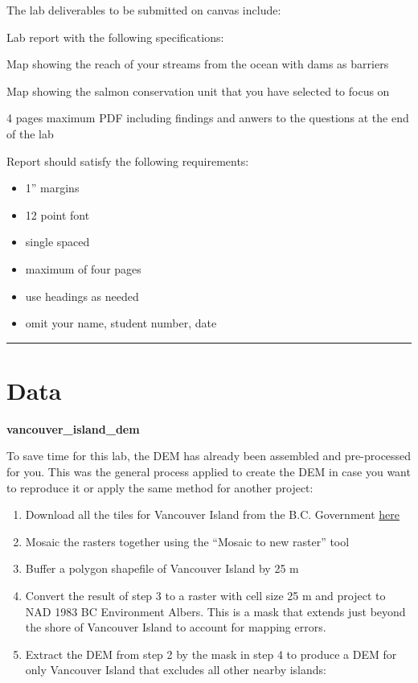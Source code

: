 \documentclass[
]{book}
\providecommand{\tightlist}{%
  \setlength{\itemsep}{0pt}\setlength{\parskip}{0pt}}
\begin{document}
The lab deliverables to be submitted on canvas include:

Lab report with the following specifications:

Map showing the reach of your streams from the ocean with dams as barriers

Map showing the salmon conservation unit that you have selected to focus on

4 pages maximum PDF including findings and anwers to the questions at the end of the lab

Report should satisfy the following requirements:

\begin{itemize}
\tightlist
\item
  1'' margins
\item
  12 point font
\item
  single spaced
\item
  maximum of four pages
\item
  use headings as needed
\item
  omit your name, student number, date
\end{itemize}

\begin{center}\rule{0.5\linewidth}{0.5pt}\end{center}

\hypertarget{data-1}{%
\section*{Data}\label{data-1}}

\textbf{vancouver\_island\_dem}

To save time for this lab, the DEM has already been assembled and pre-processed for you. This was the general process applied to create the DEM in case you want to reproduce it or apply the same method for another project:

\begin{enumerate}
\def\labelenumi{\arabic{enumi}.}
\tightlist
\item
  Download all the tiles for Vancouver Island from the B.C. Government \href{https://www2.gov.bc.ca/gov/content/data/geographic-data-services/topographic-data/elevation}{here}
\item
  Mosaic the rasters together using the ``Mosaic to new raster'' tool
\item
  Buffer a polygon shapefile of Vancouver Island by 25 m
\item
  Convert the result of step 3 to a raster with cell size 25 m and project to NAD 1983 BC Environment Albers. This is a mask that extends just beyond the shore of Vancouver Island to account for mapping errors.
\item
  Extract the DEM from step 2 by the mask in step 4 to produce a DEM for only Vancouver Island that excludes all other nearby islands:
\end{enumerate}
\end{document}
